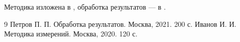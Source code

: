 Методика изложена в \cite{ivanov}, обработка результатов — в \cite{petrov}.

\begin{thebibliography}{9}
   Петров П. П. Обработка результатов. Москва, 2021. 200 с.
   Иванов И. И. Методика измерений. Москва, 2020. 120 с. %
\end{thebibliography}
